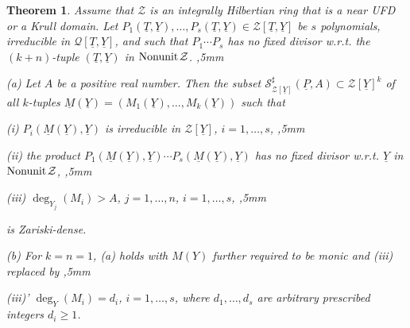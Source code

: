 \documentclass[11pt,a4paper,reqno]{amsart}
\newtheorem{thm}{Theorem}[section]
\theoremstyle{definition}
\begin{document}

\begin{thm} \label{thm:hypschistronggen}
Assume that $\mathcal{Z}$ is an integrally Hilbertian ring that is a near UFD or a Krull domain. Let $P_1(\underline T,\underline{Y}),\dots,P_s(\underline T,\underline{Y})\in \mathcal{Z}[\underline T,\underline Y]$ be $s$ polynomials, irreducible in $\mathcal{Q}[\underline T,\underline{Y}]$, and such that $P_1\cdots P_s$ has no fixed divisor \hbox{w.r.t.} the $(k+n)$-tuple $(\underline T,\underline{Y})$ in ${\rm Nonunit}\hskip 1pt \mathcal{Z}$.
,5mm    
    
\noindent
{\rm (a)} Let $A$ be a positive real number. Then the subset ${\mathcal S}^\sharp_{\mathcal{Z}[\underline Y]}(\underline P,A)\subset {\mathcal Z}[\underline Y]^k$ of  all $k$-tuples $\underline{M}(\underline{Y})=(M_1(\underline{Y}),\dots,M_k(\underline{Y}))$ such that 
\vskip 1mm

{\rm (i)} $P_i(\underline M(\underline Y),\underline Y)$ is irreducible in ${\mathcal Z}[\underline Y]$, $i=1,\ldots,s$,
,5mm

{\rm (ii)} the product $P_1(\underline{M}(\underline{Y}),\underline{Y})\cdots P_s(\underline{M}(\underline{Y}),\underline{Y})$ has no fixed divisor \hbox{w.r.t.} $\underline{Y}$ in ${\rm Nonunit}\hskip 1pt \mathcal{Z}$,
,5mm

{\rm (iii)} $\deg_{Y_j}(M_i) > A$, $j=1,\dots,n$, $i=1,\ldots,s$,
,5mm

\noindent
is Zariski-dense.
\vskip 1mm

\noindent
{\rm (b)} For $k=n=1$,  {\rm (a)} holds with $M(Y)$ further required to be monic and  {\rm (iii)} replaced by
,5mm

{\rm (iii)'} $\deg_{Y}(M_i) = d_i$, $i=1,\ldots,s$, where $d_1,\ldots,d_s$ are arbitrary prescribed integers $d_i\geq 1$.
\end{thm}
\end{document}
